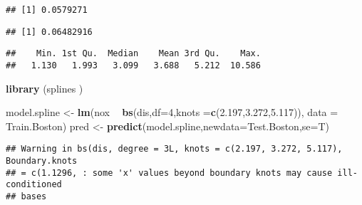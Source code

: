 \documentclass[
]{article}
\newenvironment{Shaded}{\begin{snugshade}}{\end{snugshade}}
\newcommand{\CommentTok}[1]{\textcolor[rgb]{0.56,0.35,0.01}{\textit{#1}}}
\newcommand{\DataTypeTok}[1]{\textcolor[rgb]{0.13,0.29,0.53}{#1}}
\newcommand{\DecValTok}[1]{\textcolor[rgb]{0.00,0.00,0.81}{#1}}
\newcommand{\FloatTok}[1]{\textcolor[rgb]{0.00,0.00,0.81}{#1}}
\newcommand{\KeywordTok}[1]{\textcolor[rgb]{0.13,0.29,0.53}{\textbf{#1}}}
\newcommand{\NormalTok}[1]{#1}
\newcommand{\OperatorTok}[1]{\textcolor[rgb]{0.81,0.36,0.00}{\textbf{#1}}}
\newcommand{\StringTok}[1]{\textcolor[rgb]{0.31,0.60,0.02}{#1}}
\begin{document}
\begin{verbatim}
## [1] 0.0579271
\end{verbatim}

\begin{Shaded}
\end{Shaded}

\begin{verbatim}
## [1] 0.06482916
\end{verbatim}

\begin{Shaded}
\end{Shaded}

\begin{verbatim}
##    Min. 1st Qu.  Median    Mean 3rd Qu.    Max. 
##   1.130   1.993   3.099   3.688   5.212  10.586
\end{verbatim}

\begin{Shaded}
\begin{Highlighting}[]
\KeywordTok{library}\NormalTok{ (splines )}

\NormalTok{model.spline <-}\StringTok{ }\KeywordTok{lm}\NormalTok{(nox }\OperatorTok{~}\StringTok{ }\KeywordTok{bs}\NormalTok{(dis,}\DataTypeTok{df=}\DecValTok{4}\NormalTok{,}\DataTypeTok{knots =}\KeywordTok{c}\NormalTok{(}\FloatTok{2.197}\NormalTok{,}\FloatTok{3.272}\NormalTok{,}\FloatTok{5.117}\NormalTok{)), }\DataTypeTok{data =}\NormalTok{ Train.Boston)}
\NormalTok{pred <-}\StringTok{ }\KeywordTok{predict}\NormalTok{(model.spline,}\DataTypeTok{newdata=}\NormalTok{Test.Boston,}\DataTypeTok{se=}\NormalTok{T)}
\end{Highlighting}
\end{Shaded}

\begin{verbatim}
## Warning in bs(dis, degree = 3L, knots = c(2.197, 3.272, 5.117), Boundary.knots
## = c(1.1296, : some 'x' values beyond boundary knots may cause ill-conditioned
## bases
\end{verbatim}
\end{document}
